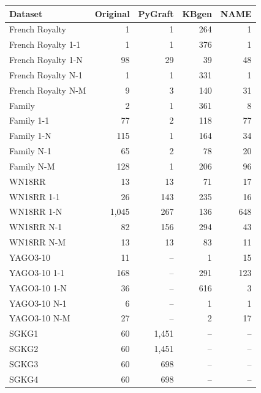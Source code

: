 \begin{tabular}{lrrrr}
\toprule
Dataset & Original & PyGraft & KBgen & NAME \\
\midrule
French Royalty & 1 & 1 & 264 & 1 \\
French Royalty 1-1 & 1 & 1 & 376 & 1 \\
French Royalty 1-N & 98 & 29 & 39 & 48 \\
French Royalty N-1 & 1 & 1 & 331 & 1 \\
French Royalty N-M & 9 & 3 & 140 & 31 \\
\midrule
Family & 2 & 1 & 361 & 8 \\
Family 1-1 & 77 & 2 & 118 & 77 \\
Family 1-N & 115 & 1 & 164 & 34 \\
Family N-1 & 65 & 2 & 78 & 20 \\
Family N-M & 128 & 1 & 206 & 96 \\
\midrule
WN18RR & 13 & 13 & 71 & 17 \\
WN18RR 1-1 & 26 & 143 & 235 & 16 \\
WN18RR 1-N & 1{,}045 & 267 & 136 & 648 \\
WN18RR N-1 & 82 & 156 & 294 & 43 \\
WN18RR N-M & 13 & 13 & 83 & 11 \\
\midrule
YAGO3-10 & 11 & – & 1 & 15 \\
YAGO3-10 1-1 & 168 & – & 291 & 123 \\
YAGO3-10 1-N & 36 & – & 616 & 3 \\
YAGO3-10 N-1 & 6 & – & 1 & 1 \\
YAGO3-10 N-M & 27 & – & 2 & 17 \\
\midrule
SGKG1 & 60 & 1{,}451 & – & – \\
SGKG2 & 60 & 1{,}451 & – & – \\
SGKG3 & 60 & 698 & – & – \\
SGKG4 & 60 & 698 & – & – \\
\bottomrule
\end{tabular}
